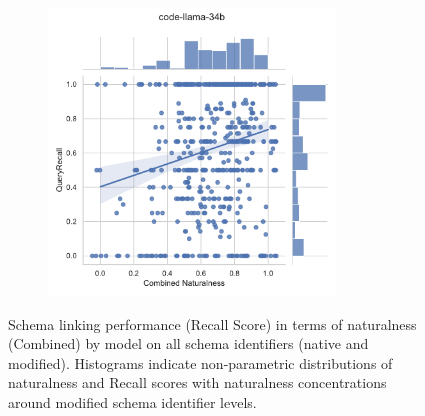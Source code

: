 \begin{figure}
\begin{subfigure}{.5\textwidth}
    \end{subfigure}%
    \begin{subfigure}{.5\textwidth}
      \centering
      \includegraphics[height=3in]{figures/distribution-jointplots/jointplot-code-llama-34b-combined-nat-all-schemas-recall-with-distributions.pdf}
    \end{subfigure}
    \caption{Schema linking performance (Recall Score) in terms of naturalness (Combined) by model on all schema identifiers (native and modified). Histograms indicate non-parametric distributions of naturalness and Recall scores with naturalness concentrations around modified schema identifier levels.}
    \label{fig:distribution-jointplot-combined-recall}
  \end{figure}
  
